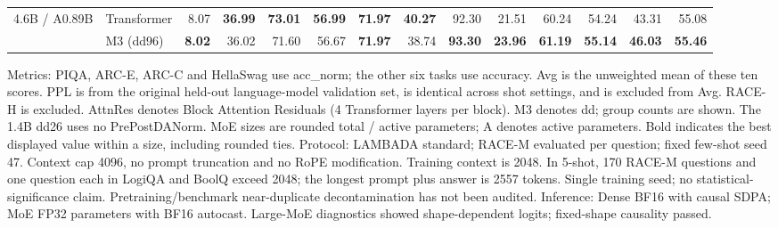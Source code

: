 \documentclass{article}
\begin{document}
\begin{table}[p]
{\begin{tabular}{llrrrrrrrrrrrr}
\midrule
4.6B / A0.89B & Transformer & 8.07 & \textbf{36.99} & \textbf{73.01} & \textbf{56.99} & \textbf{71.97} & \textbf{40.27} & 92.30 & 21.51 & 60.24 & 54.24 & 43.31 & 55.08 \\
 & M3 (dd96) & \textbf{8.02} & 36.02 & 71.60 & 56.67 & \textbf{71.97} & 38.74 & \textbf{93.30} & \textbf{23.96} & \textbf{61.19} & \textbf{55.14} & \textbf{46.03} & \textbf{55.46} \\
\bottomrule
\end{tabular}}
\par\smallskip\footnotesize\raggedright
Metrics: PIQA, ARC-E, ARC-C and HellaSwag use acc_norm; the other six tasks use accuracy. Avg is the unweighted mean of these ten scores. PPL is from the original held-out language-model validation set, is identical across shot settings, and is excluded from Avg. RACE-H is excluded. AttnRes denotes Block Attention Residuals (4 Transformer layers per block). M3 denotes dd; group counts are shown. The 1.4B dd26 uses no PrePostDANorm. MoE sizes are rounded total / active parameters; A denotes active parameters. Bold indicates the best displayed value within a size, including rounded ties. Protocol: LAMBADA standard; RACE-M evaluated per question; fixed few-shot seed 47. Context cap 4096, no prompt truncation and no RoPE modification. Training context is 2048. In 5-shot, 170 RACE-M questions and one question each in LogiQA and BoolQ exceed 2048; the longest prompt plus answer is 2557 tokens. Single training seed; no statistical-significance claim. Pretraining/benchmark near-duplicate decontamination has not been audited. Inference: Dense BF16 with causal SDPA; MoE FP32 parameters with BF16 autocast. Large-MoE diagnostics showed shape-dependent logits; fixed-shape causality passed.
\end{table}
\clearpage
\end{document}
